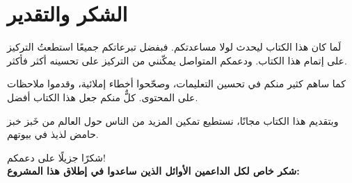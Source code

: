 %
%

\chapter{الشكر والتقدير}%
\label{ch:Acknowledgments}
لَما كان هذا الكتاب ليحدث لولا مساعدتكم. فبفضل تبرعاتكم جميعًا استطعتُ التركيز على إتمام هذا الكتاب. ودعمكم المتواصل يمكّنني من التركيز على تحسينه أكثر فأكثر.

كما ساهم كثير منكم في تحسين التعليمات، وصحّحوا أخطاء إملائية، وقدموا ملاحظات على المحتوى. كلٌّ منكم جعل هذا الكتاب أفضل.

وبتقديم هذا الكتاب مجانًا، نستطيع تمكين المزيد من الناس حول العالم من خَبز خبز حامض لذيذ في بيوتهم.

شكرًا جزيلًا على دعمكم!\\

\textbf{شكر خاص لكل الداعمين الأوائل الذين ساعدوا في إطلاق هذا المشروع:\\}

{ 
\par}
